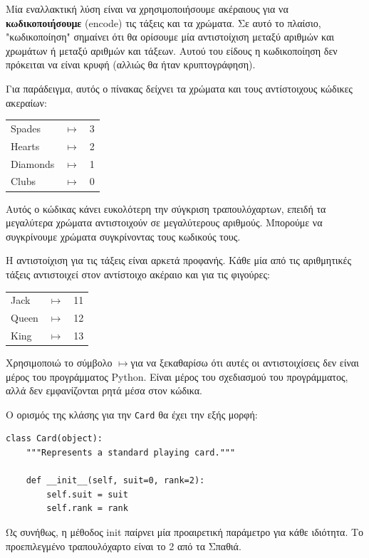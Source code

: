 \documentclass[10pt]{book}
\begin{document}
Μία εναλλακτική λύση είναι να χρησιμοποιήσουμε ακέραιους για να {\bf κωδικοποιήσουμε} (encode) τις
τάξεις και τα χρώματα. Σε αυτό το πλαίσιο, "κωδικοποίηση" σημαίνει ότι θα ορίσουμε μία
αντιστοίχιση μεταξύ αριθμών και χρωμάτων ή μεταξύ αριθμών και τάξεων. 
Αυτού του είδους η κωδικοποίηση δεν πρόκειται να είναι κρυφή (αλλιώς θα ήταν κρυπτογράφηση). 

\newcommand{\mymapsto}{$\mapsto$}

Για παράδειγμα, αυτός ο πίνακας δείχνει τα χρώματα και τους αντίστοιχους κώδικες ακεραίων:

\begin{tabular}{l c l}
Spades & \mymapsto & 3 \\
Hearts & \mymapsto & 2 \\
Diamonds & \mymapsto & 1 \\
Clubs & \mymapsto & 0
\end{tabular}

Αυτός ο κώδικας κάνει ευκολότερη την σύγκριση τραπουλόχαρτων, επειδή τα μεγαλύτερα
χρώματα αντιστοιχούν σε μεγαλύτερους αριθμούς. Μπορούμε να συγκρίνουμε χρώματα συγκρίνοντας
τους κωδικούς τους.

Η αντιστοίχιση για τις τάξεις είναι αρκετά προφανής. Κάθε μία από τις αριθμητικές τάξεις 
αντιστοιχεί στον αντίστοιχο ακέραιο και για τις φιγούρες:

\begin{tabular}{l c l}
Jack & \mymapsto & 11 \\
Queen & \mymapsto & 12 \\
King & \mymapsto & 13 \\
\end{tabular}

Χρησιμοποιώ το σύμβολο \mymapsto για να ξεκαθαρίσω ότι αυτές οι αντιστοιχίσεις δεν είναι μέρος του
προγράμματος Python. Είναι μέρος του σχεδιασμού του προγράμματος, αλλά δεν εμφανίζονται ρητά μέσα στον κώδικα.

Ο ορισμός της κλάσης για την {\tt Card} θα έχει την εξής μορφή:

\begin{verbatim}
class Card(object):
    """Represents a standard playing card."""

    def __init__(self, suit=0, rank=2):
        self.suit = suit
        self.rank = rank
\end{verbatim}
%
Ως συνήθως, η μέθοδος init παίρνει μία προαιρετική παράμετρο για κάθε ιδιότητα.
Το προεπιλεγμένο τραπουλόχαρτο είναι το 2 από τα Σπαθιά.
\end{document}
